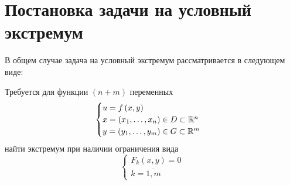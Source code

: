 \documentclass[../../main.tex]{subfiles}
\begin{document}
\section{Постановка задачи на условный экстремум}

В общем случае задача на условный экстремум рассматривается в 
следующем виде:

Требуется для функции $(n+m)$ переменных
\begin{equation}
\label{lec_10.num_0}
\begin{cases}
	u = f\left( x, y \right) \\
	x = \left( x_1, \ldots, x_n \right) \in D \subset \mathbb{R}^n \\
	y = \left( y_1, \ldots, y_m \right) \in G \subset \mathbb{R}^m
\end{cases}
\end{equation}
найти экстремум при наличии ограничения вида
\begin{equation}
\begin{cases} \label{lec_10.num_1}
F_k(x, y) = 0 \\
k = \overline{1, m}
\end{cases} 
\end{equation}
\end{document}
